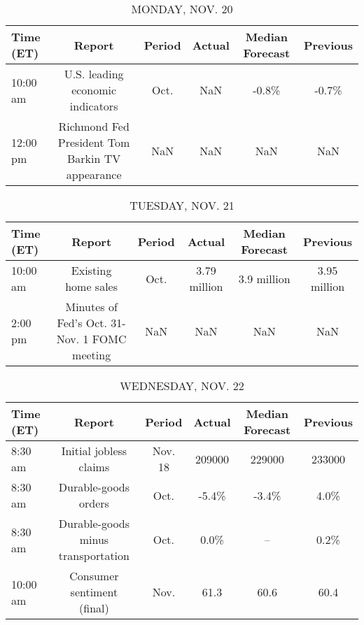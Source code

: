 \documentclass{article}%
\begin{document}
%
\normalsize%


\begin{table}[htbp]%
\caption{MONDAY, NOV. 20}%
\centering%
\begin{adjustbox}{width=1\textwidth}%
\begin{tabular}{lccccc}
\toprule
Time (ET) &                                          Report & Period & Actual & Median Forecast & Previous \\
\midrule
 10:00 am &                U.S. leading economic indicators &   Oct. &    NaN &           -0.8\% &    -0.7\% \\
 12:00 pm & Richmond Fed President Tom Barkin TV appearance &    NaN &    NaN &             NaN &      NaN \\
\bottomrule
\end{tabular}
%
\end{adjustbox}%
\end{table}

%


\begin{table}[htbp]%
\caption{TUESDAY, NOV. 21}%
\centering%
\begin{adjustbox}{width=1\textwidth}%
\begin{tabular}{lccccc}
\toprule
Time (ET) &                                       Report & Period &       Actual & Median Forecast &     Previous \\
\midrule
 10:00 am &                          Existing home sales &   Oct. & 3.79 million &     3.9 million & 3.95 million \\
  2:00 pm & Minutes of Fed's Oct. 31-Nov. 1 FOMC meeting &    NaN &          NaN &             NaN &          NaN \\
\bottomrule
\end{tabular}
%
\end{adjustbox}%
\end{table}

%


\begin{table}[htbp]%
\caption{WEDNESDAY, NOV. 22}%
\centering%
\begin{adjustbox}{width=1\textwidth}%
\begin{tabular}{lccccc}
\toprule
Time (ET) &                             Report &  Period & Actual & Median Forecast & Previous \\
\midrule
  8:30 am &             Initial jobless claims & Nov. 18 & 209000 &          229000 &   233000 \\
  8:30 am &               Durable-goods orders &    Oct. &  -5.4\% &           -3.4\% &     4.0\% \\
  8:30 am & Durable-goods minus transportation &    Oct. &   0.0\% &              -- &     0.2\% \\
 10:00 am &         Consumer sentiment (final) &    Nov. &   61.3 &            60.6 &     60.4 \\
\bottomrule
\end{tabular}
%
\end{adjustbox}%
\end{table}
\end{document}
